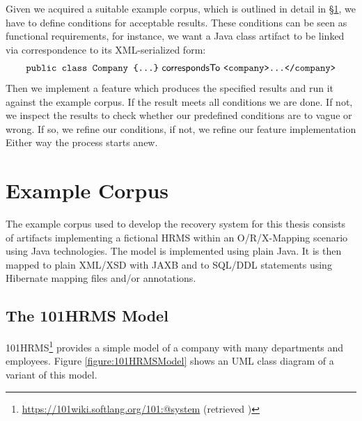 Given we acquired a suitable example corpus, which is outlined in detail in §\ref{section:ExampleCorpus}, we have to define conditions for acceptable results.
These conditions can be seen as functional requirements, for instance, we want a \gls{Java} class artifact to be linked via correspondence to its \gls{XML}-serialized form:
{
\footnotesize
\begin{align*}
\texttt{public class Company \{...\}} ~\textsf{correspondsTo}~ \texttt{<company>...</company>}
\end{align*}
}%
Then we implement a feature which produces the specified results and run it against the example corpus.
If the result meets all conditions we are done.
If not, we inspect the results to check whether our predefined conditions are to vague or wrong.
If so, we refine our conditions, if not, we refine our feature implementation
Either way the process starts anew.


\section{Example Corpus}
\label{section:ExampleCorpus}
The example corpus used to develop the recovery system for this thesis consists of artifacts implementing a fictional \gls{HRMS} within an \gls{O/R/X-Mapping} scenario using \gls{Java} technologies.
The model is implemented using plain \Gls{Java}. 
It is then mapped to plain \gls{XML}/\gls{XSD} with \gls{JAXB} and to \gls{SQL/DDL} statements using \gls{Hibernate} mapping files and/or annotations.



\subsection{The 101HRMS Model}
\gls{101HRMS}\footnote{\url{https://101wiki.softlang.org/101:@system} (retrieved )} provides a simple model of a company with many departments and employees.
Figure \ref{figure:101HRMSModel} shows an \gls{UML} class diagram of a variant of this model.

